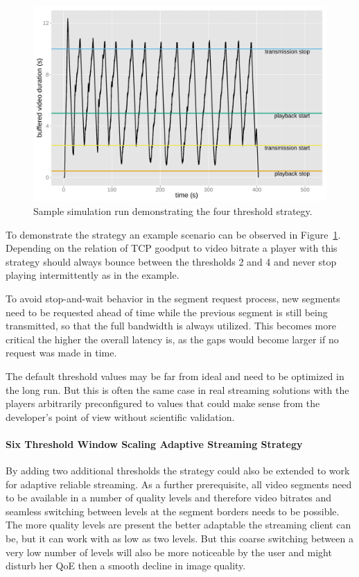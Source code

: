 \begin{figure}[htb]
	\centering
	\includegraphics[width=1.0\textwidth]{images/R-ltesim-plotbuffer-time.pdf}
	\caption{Sample simulation run demonstrating the four threshold strategy.}
\label{c6:fig:ltesim-plotbuffer-time}
\end{figure}

To demonstrate the strategy an example scenario can be observed in Figure~\ref{c6:fig:ltesim-plotbuffer-time}. Depending on the relation of \gls{TCP} goodput to video bitrate a player with this strategy should always bounce between the thresholds 2 and 4 and never stop playing intermittently as in the example.

To avoid stop-and-wait behavior in the segment request process, new segments need to be requested ahead of time while the previous segment is still being transmitted, so that the full bandwidth is always utilized. This becomes more critical the higher the overall latency is, as the gaps would become larger if no request was made in time.

The default threshold values may be far from ideal and need to be optimized in the long run. But this is often the same case in real streaming solutions with the players arbitrarily preconfigured to values that could make sense from the developer's point of view without scientific validation.


\paragraph{Six Threshold Window Scaling Adaptive Streaming Strategy}

By adding two additional thresholds the strategy could also be extended to work for adaptive reliable streaming. As a further prerequisite, all video segments need to be available in a number of quality levels and therefore video bitrates and seamless switching between levels at the segment borders needs to be possible. The more quality levels are present the better adaptable the streaming client can be, but it can work with as low as two levels. But this coarse switching between a very low number of levels will also be more noticeable by the user and might disturb her \gls{QoE} then a smooth decline in image quality.

